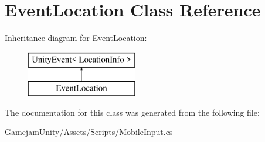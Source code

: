 \hypertarget{class_event_location}{}\section{Event\+Location Class Reference}
\label{class_event_location}
Inheritance diagram for Event\+Location\+:\begin{figure}[H]
\begin{center}
\leavevmode
\includegraphics[height=2.000000cm]{class_event_location}
\end{center}
\end{figure}


The documentation for this class was generated from the following file\+:\begin{DoxyCompactItemize}
\item 
Gamejam\+Unity/\+Assets/\+Scripts/Mobile\+Input.\+cs\end{DoxyCompactItemize}

